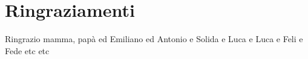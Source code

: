 \thispagestyle{plain}

\section*{Ringraziamenti}
Ringrazio mamma, papà ed Emiliano ed Antonio e Solida e Luca e Luca e Feli e Fede etc etc